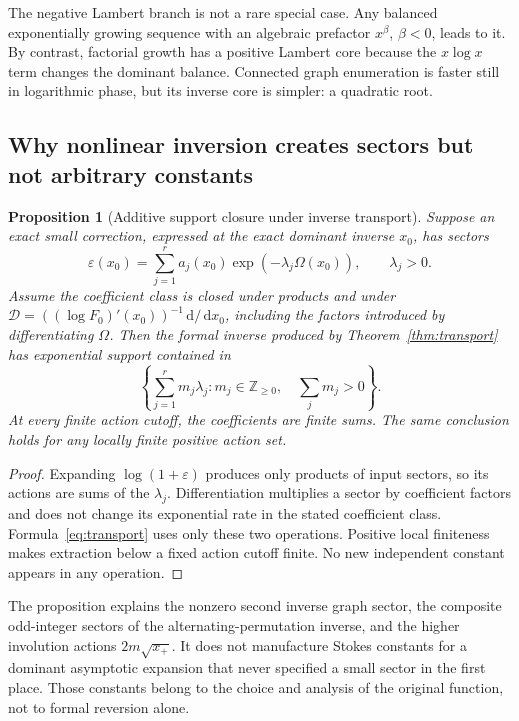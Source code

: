 \documentclass[11pt,a4paper]{article}
\numberwithin{equation}{section}
\newtheorem{proposition}[theorem]{Proposition}
\theoremstyle{definition}
\theoremstyle{remark}
\newcommand{\dd}{\,\mathrm d}
\begin{document}
The negative Lambert branch is not a rare special case. Any balanced exponentially growing sequence with an algebraic prefactor $x^\beta$, $\beta<0$, leads to it. By contrast, factorial growth has a positive Lambert core because the $x\log x$ term changes the dominant balance. Connected graph enumeration is faster still in logarithmic phase, but its inverse core is simpler: a quadratic root.

\subsection{Why nonlinear inversion creates sectors but not arbitrary constants}

\begin{proposition}[Additive support closure under inverse transport]
\label{prop:support}
Suppose an exact small correction, expressed at the exact dominant inverse $x_0$, has sectors
\[
 \varepsilon(x_0)=\sum_{j=1}^r
       a_j(x_0)\exp(-\lambda_j\Omega(x_0)),\qquad\lambda_j>0.
\]
Assume the coefficient class is closed under products and under
$\mathcal D=((\log F_0)'(x_0))^{-1}\dd/\dd x_0$, including the factors introduced by differentiating $\Omega$. Then the formal inverse produced by Theorem~\ref{thm:transport} has exponential support contained in
\[
 \left\{\sum_{j=1}^rm_j\lambda_j:
              m_j\in\mathbb Z_{\ge0},\quad\sum_jm_j>0\right\}.
\]
At every finite action cutoff, the coefficients are finite sums. The same conclusion holds for any locally finite positive action set.
\end{proposition}
\begin{proof}
Expanding $\log(1+\varepsilon)$ produces only products of input sectors, so its actions are sums of the $\lambda_j$. Differentiation multiplies a sector by coefficient factors and does not change its exponential rate in the stated coefficient class. Formula~\eqref{eq:transport} uses only these two operations. Positive local finiteness makes extraction below a fixed action cutoff finite. No new independent constant appears in any operation.
\end{proof}

The proposition explains the nonzero second inverse graph sector, the composite odd-integer sectors of the alternating-permutation inverse, and the higher involution actions $2m\sqrt{x_+}$. It does not manufacture Stokes constants for a dominant asymptotic expansion that never specified a small sector in the first place. Those constants belong to the choice and analysis of the original function, not to formal reversion alone.
\end{document}

